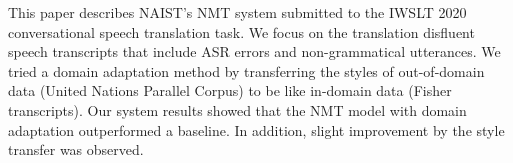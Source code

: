 This paper describes NAIST's NMT system submitted to the IWSLT 2020 conversational speech translation task. We focus on the translation disfluent speech transcripts that include ASR errors and non-grammatical utterances. We tried a domain adaptation method by transferring the styles of out-of-domain data (United Nations Parallel Corpus) to be like in-domain data (Fisher transcripts). Our system results showed that the NMT model with domain adaptation outperformed a baseline. In addition, slight improvement by the style transfer was observed.
